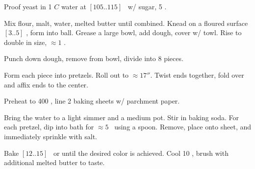 \begin{preparation}
\item Proof yeast in 1 $C$ water at $[105..115]$ \Fahrenheit~w/ sugar, 5 \minute.

\item Mix flour, malt, water, melted butter until combined.
    Knead on a floured surface $[3..5]$ \minute, form into ball.
    Grease a large bowl, add dough, cover w/ towl.
    Rise to double in size, $\approx 1$ \hour.

\item Punch down dough, remove from bowl, divide into 8 pieces.

\item Form each piece into pretzels.
    Roll out to $\approx 17''$.
    Twist ends together, fold over and affix ends to the center.

\item Preheat to 400 \Fahrenheit, line 2 baking sheets w/ parchment paper.

\item Bring the water to a light simmer and a medium pot.
    Stir in baking soda.
    For each pretzel, dip into bath for $\approx 5$ \second~using a spoon.
    Remove, place onto sheet, and immediately sprinkle with salt.

\item Bake $[12..15]$ \minute~or until the desired color is achieved.
    Cool 10 \minute, brush with additional melted butter to taste.
\end{preparation}

\recipeend%
